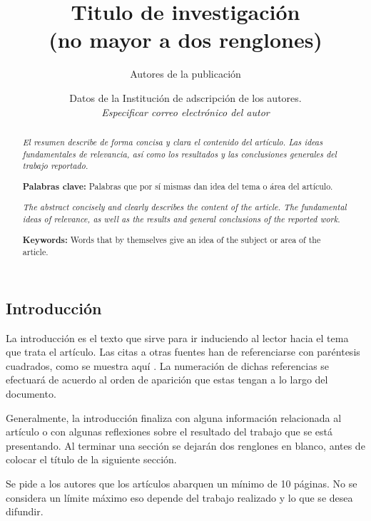 \documentclass[10pt]{article}
\title{\Huge Titulo de investigación\\(no mayor a dos renglones)}
\author{\Large Autores de la publicación}
\date{\normalsize Datos de la Institución de adscripción de los autores.\\
\textit{Especificar correo electrónico del autor}}
\begin{document}
\maketitle


\begin{abstract}
    \textit{\normalsize El resumen describe de forma concisa y clara el contenido del artículo. Las ideas fundamentales de relevancia, así como los resultados y las conclusiones generales del trabajo reportado.}
    
    \vspace{0.5cm}

    \textbf{Palabras clave:} Palabras que por sí mismas dan idea del tema o área del artículo.
\end{abstract}


\begin{abstract}
    \textit{\normalsize The abstract concisely and clearly describes the content of the article. The fundamental ideas of relevance, as well as the results and general conclusions of the reported work.}
    
    \vspace{0.5cm}

    \textbf{Keywords:} Words that by themselves give an idea of the subject or area of the article.
\end{abstract}



\begin{center}
    \section{Introducción}
\end{center}

    La introducción es el texto que sirve para ir induciendo al lector hacia el tema que trata el artículo. Las citas a otras fuentes han de referenciarse con paréntesis cuadrados, como se muestra aquí \cite{greenwade93}. La numeración de dichas referencias se efectuará de acuerdo al orden de aparición que estas tengan a lo largo del documento.

    Generalmente, la introducción finaliza con alguna información relacionada al artículo o con algunas reflexiones sobre el resultado del trabajo que se está presentando. Al terminar una sección se dejarán dos renglones en blanco, antes de colocar el título de la siguiente sección.

    Se pide a los autores que los artículos abarquen un mínimo de 10 páginas. No se considera un límite máximo eso depende del trabajo realizado y lo que se desea difundir.
\end{document}
